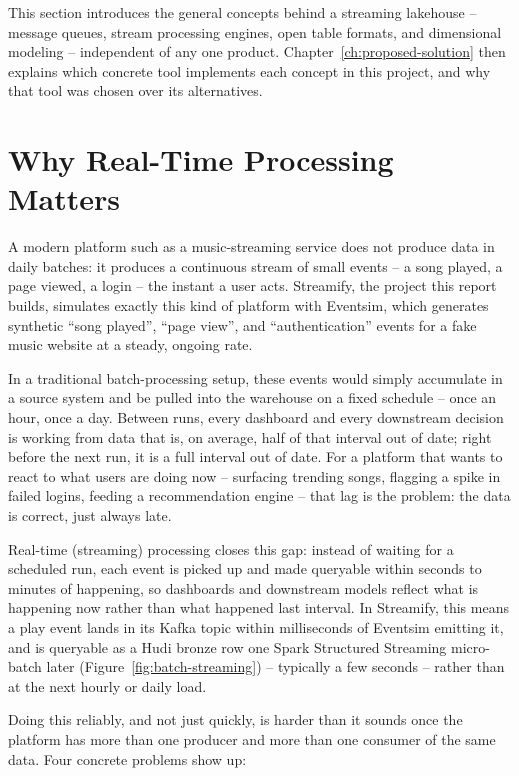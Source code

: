 
This section introduces the general concepts behind a streaming lakehouse -- message queues, stream processing engines, open table formats, and dimensional modeling -- independent of any one product. Chapter~\ref{ch:proposed-solution} then explains which concrete tool implements each concept in this project, and why that tool was chosen over its alternatives.

\section{Why Real-Time Processing Matters}
\label{sec:why-realtime}

A modern platform such as a music-streaming service does not produce data in daily batches: it produces a continuous stream of small events -- a song played, a page viewed, a login -- the instant a user acts. Streamify, the project this report builds, simulates exactly this kind of platform with Eventsim, which generates synthetic ``song played'', ``page view'', and ``authentication'' events for a fake music website at a steady, ongoing rate.

In a traditional batch-processing setup, these events would simply accumulate in a source system and be pulled into the warehouse on a fixed schedule -- once an hour, once a day. Between runs, every dashboard and every downstream decision is working from data that is, on average, half of that interval out of date; right before the next run, it is a full interval out of date. For a platform that wants to react to what users are doing now -- surfacing trending songs, flagging a spike in failed logins, feeding a recommendation engine -- that lag is the problem: the data is correct, just always late.

Real-time (streaming) processing closes this gap: instead of waiting for a scheduled run, each event is picked up and made queryable within seconds to minutes of happening, so dashboards and downstream models reflect what is happening now rather than what happened last interval. In Streamify, this means a play event lands in its Kafka topic within milliseconds of Eventsim emitting it, and is queryable as a Hudi bronze row one Spark Structured Streaming micro-batch later (Figure~\ref{fig:batch-streaming}) -- typically a few seconds -- rather than at the next hourly or daily load.

Doing this reliably, and not just quickly, is harder than it sounds once the platform has more than one producer and more than one consumer of the same data. Four concrete problems show up:

